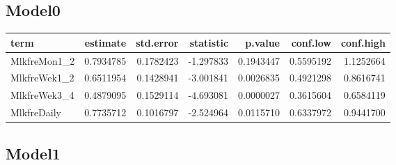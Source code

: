 \documentclass[]{article}
\newenvironment{Shaded}{\begin{snugshade}}{\end{snugshade}}
\newcommand{\DataTypeTok}[1]{\textcolor[rgb]{0.13,0.29,0.53}{#1}}
\newcommand{\KeywordTok}[1]{\textcolor[rgb]{0.13,0.29,0.53}{\textbf{#1}}}
\newcommand{\NormalTok}[1]{#1}
\newcommand{\OperatorTok}[1]{\textcolor[rgb]{0.81,0.36,0.00}{\textbf{#1}}}
\newcommand{\OtherTok}[1]{\textcolor[rgb]{0.56,0.35,0.01}{#1}}
\newcommand{\StringTok}[1]{\textcolor[rgb]{0.31,0.60,0.02}{#1}}
\begin{document}
\hypertarget{model0-9}{%
\subsection{Model0}\label{model0-9}}

\begin{Shaded}
\end{Shaded}

\begin{longtable}[]{@{}lrrrrrr@{}}
\toprule
term & estimate & std.error & statistic & p.value & conf.low &
conf.high\tabularnewline
\midrule
\endhead
MlkfreMon1\_2 & 0.7934785 & 0.1782423 & -1.297833 & 0.1943447 &
0.5595192 & 1.1252664\tabularnewline
MlkfreWek1\_2 & 0.6511954 & 0.1428941 & -3.001841 & 0.0026835 &
0.4921298 & 0.8616741\tabularnewline
MlkfreWek3\_4 & 0.4879095 & 0.1529114 & -4.693081 & 0.0000027 &
0.3615604 & 0.6584119\tabularnewline
MlkfreDaily & 0.7735712 & 0.1016797 & -2.524964 & 0.0115710 & 0.6337972
& 0.9441700\tabularnewline
\bottomrule
\end{longtable}

\hypertarget{model1-9}{%
\subsection{Model1}\label{model1-9}}

\begin{Shaded}
\end{Shaded}
\end{document}
